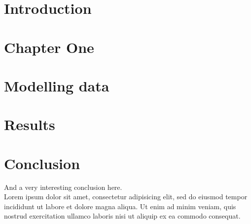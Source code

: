 \documentclass[a4paper, oneside, french, 12pt, final]{extreport}
\begin{document}
\tableofcontents
{}
\cleardoublepage%

\listoffigures
\cleardoublepage%

\listoftables
\cleardoublepage

\listofalgorithms
{}
\cleardoublepage









\chapter*{Introduction}
\label{chap:general_intorduction}
%



\chapter{Chapter One}%
\label{chap:chapterone}



\chapter{Modelling data}
\label{chap:2}


\chapter{Results}
\label{chap:3}
%
%



\chapter*{Conclusion}
\label{chap:conclusion}
%
And a very interesting conclusion here\@. ~\\
Lorem ipsum dolor sit amet, consectetur adipisicing elit, sed do eiusmod
tempor incididunt ut labore et dolore magna aliqua. Ut enim ad minim veniam,
quis nostrud exercitation ullamco laboris nisi ut aliquip ex ea commodo
consequat.
\end{document}
